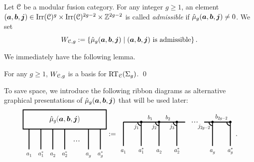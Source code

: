 \documentclass[11pt]{article}
\begin{document}
\begin{definition}\label{def:W-base}
Let $\mathcal{C}$ be a modular fusion category. For any integer $g \ge 1$, an element $(\bm{a}, \bm{b}, \bm{j})\in 
{\operatorname{Irr}}(\mathcal{C})^{g}  \times {\operatorname{Irr}}(\mathcal{C})^{2g-2} \times {\mathbb{Z}}^{2g-2}$
is called \emph{admissible} if  ${\hat{\mu}_{g}(\bm{a}, \bm{b}, \bm{j})} \ne 0$. We set 
\[W_{\mathcal{C}, g} := \{{\hat{\mu}_{g}(\bm{a}, \bm{b}, \bm{j})} \mid (\bm{a}, \bm{b}, \bm{j}) \text{ is admissible}\}\,.\qedhere\] 
\end{definition}
We immediately have the following lemma.
\begin{lemma}\label{lem:W-basis}
For any $g \ge 1$, $W_{\mathcal{C}, g}$ is a basis for $\operatorname{RT}_{\mathcal{C}}(\Sigma_{g})$. \qed
\end{lemma}
To save space, we introduce the following ribbon diagrams as alternative graphical presentations of ${\hat{\mu}_{g}(\bm{a}, \bm{b}, \bm{j})}$ that will be used later:
\begin{equation}\label{eq:RTbasis}
\vcenter{\hbox{\scalebox{0.6}{
\begin{tikzpicture}[line width=2pt]
\draw (-3.5,-0.8) rectangle (3.5,0.8); 
\node at (0,0) {\LARGE $\Wbase{g}{a}{b}{j}$};
\foreach\x in {1,2}{
\draw(2*\x-5,-0.8)--(2*\x-5,-2.5); \node[below]at(2*\x-5,-2.5){\Large $a_{\x}^{\phantom{*}}$};
\draw(2*\x-4,-0.8)--(2*\x-4,-2.5);\node[below]at(2*\x-4,-2.5){\Large $a_{\x}^*$};}
\draw (2,-0.8)--(2,-2.5);\node[below] at (2,-2.5) {\Large $a_g^{\phantom{*}}$};
\draw (3,-0.8)--(3,-2.5);\node[below] at (3,-2.5) {\Large $a_g^*$};
\foreach\x in {1,2,3} {\fill[black] (0.6+0.2*\x,-1.8) circle (1pt);}
\end{tikzpicture}}}}
:=
\vcenter{\hbox{\scalebox{0.6}{
\begin{tikzpicture}[line width=2pt]
\draw (0,2)--(5.2,2); \draw(6.8,2)--(9,2);
\node[below] at (0,0) {\Large $a_1^{\phantom{*}}$};
\node[below] at (1.5,0) {\Large $a_1^{*}$};
\node[below] at (3,0) {\Large $a_2^{\phantom{*}}$};
\node[below] at (4.5,0) {\Large $a_2^{{*}}$};
\node[below] at (7.5,0) {\Large $a_g^{\phantom{*}}$};
\node[below] at (9,0) {\Large $a_g^{{*}}$};
\foreach \x in {0,1,2,3,5,6}{\draw (1.5*\x, 2)--(1.5*\x,0);}
\foreach\x in {1,2,3,5,6}
{\begin{scope}[shift={(1.5*\x, 2)}]
\draw ([shift=(180:0.3cm)]0,0) arc (180:270:0.3cm);
\fill[black] (0,0) circle (3pt);
\end{scope}}
\foreach\x in {1,2,3}{\fill[black] (5.6+0.2*\x,2) circle (1pt);}
\foreach\x in {1,2,3}{\node[left] at (1.5*\x-0.05,1.6) {\Large $j_{\x}$};}
\node[left]at(7.5-0.05,1.6){\Large $j_{2g-2}$};
\node[above] at (2.25,2) {\Large $b_1$};
\node[above] at (2.25+1.5,2) {\Large $b_2$};
\node[above] at (8.25,2) {\Large $b_{2g-2}$};
\end{tikzpicture}}}}\,.
\end{equation}
\end{document}
